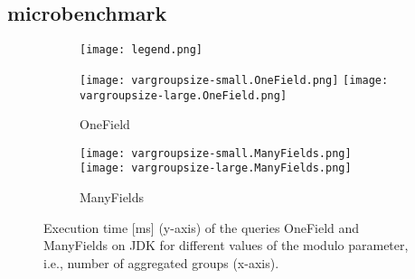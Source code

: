 \documentclass{article}
\begin{document}
\subsection{microbenchmark}
\begin{figure*}[h!]
    \centering

    \begin{subfigure}[b]{0.6\textwidth}
        \centering
        \texttt{[image: legend.png]}
    \end{subfigure}

    \begin{subfigure}[b]{0.98\textwidth}
        \centering
        \texttt{[image: vargroupsize-small.OneField.png]}
        \texttt{[image: vargroupsize-large.OneField.png]}
        \caption{OneField}
    \end{subfigure}

    \begin{subfigure}[b]{0.98\textwidth}
        \centering
        \texttt{[image: vargroupsize-small.ManyFields.png]}
        \texttt{[image: vargroupsize-large.ManyFields.png]}
        \caption{ManyFields}
    \end{subfigure}

    \caption{Execution time [ms] (y-axis) of the queries OneField and ManyFields on JDK for different values of the modulo parameter, i.e., number of aggregated groups (x-axis).}
\end{figure*}
\end{document}

